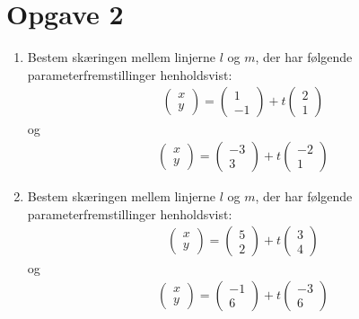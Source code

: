 \section*{Opgave 2}
\begin{enumerate}[label=\roman*)]

\item Bestem skæringen mellem linjerne $l$ og $m$, der har følgende parameterfremstillinger henholdsvist:
\begin{align*}
\begin{pmatrix}
x \\ y
\end{pmatrix}
= 
\begin{pmatrix}
1 \\ -1
\end{pmatrix}
+
t
\begin{pmatrix}
2 \\ 1
\end{pmatrix}
\end{align*}
og 
\begin{align*}
\begin{pmatrix}
x \\ y
\end{pmatrix}
= 
\begin{pmatrix}
-3 \\ 3
\end{pmatrix}
+
t
\begin{pmatrix}
-2 \\ 1
\end{pmatrix}
\end{align*}

\item Bestem skæringen mellem linjerne $l$ og $m$, der har følgende parameterfremstillinger henholdsvist:
\begin{align*}
\begin{pmatrix}
x \\ y
\end{pmatrix}
= 
\begin{pmatrix}
5 \\ 2
\end{pmatrix}
+
t
\begin{pmatrix}
3 \\ 4
\end{pmatrix}
\end{align*}
og 
\begin{align*}
\begin{pmatrix}
x \\ y
\end{pmatrix}
= 
\begin{pmatrix}
-1 \\ 6
\end{pmatrix}
+
t
\begin{pmatrix}
-3 \\ 6
\end{pmatrix}
\end{align*}

\end{enumerate}

